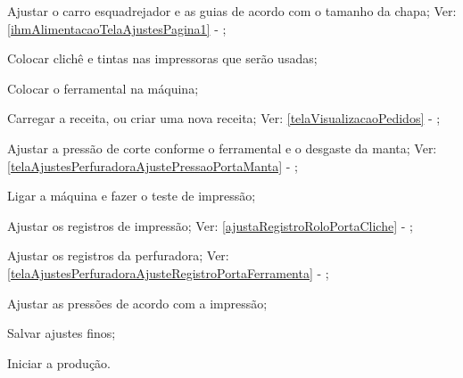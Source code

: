 \begin{procedureAdjustmentRecipe}
  
  \item[\ding{\dingNumber}] Ajustar o carro esquadrejador e as guias de acordo com o tamanho da chapa; Ver: \ref{ihmAlimentacaoTelaAjustesPagina1} - ;
  \item[\ding{\dingNumber}] Colocar clichê e tintas nas impressoras que serão usadas;
  \item[\ding{\dingNumber}] Colocar o ferramental na máquina;
  \item[\ding{\dingNumber}] Carregar a receita, ou criar uma nova receita; Ver: \ref{telaVisualizacaoPedidos} - ;
  \item[\ding{\dingNumber}] Ajustar a pressão de corte conforme o ferramental e o desgaste da manta; Ver: \ref{telaAjustesPerfuradoraAjustePressaoPortaManta} - ;
  \item[\ding{\dingNumber}] Ligar a máquina e fazer o teste de impressão;
  \item[\ding{\dingNumber}] Ajustar os registros de impressão; Ver: \ref{ajustaRegistroRoloPortaCliche} - ;
  \item[\ding{\dingNumber}] Ajustar os registros da perfuradora; Ver: \ref{telaAjustesPerfuradoraAjusteRegistroPortaFerramenta} - ;
  \item[\ding{\dingNumber}] Ajustar as pressões de acordo com a impressão;
  \item[\ding{\dingNumber}] Salvar ajustes finos;
  \item[\ding{\dingNumber}] Iniciar a produção.
  
\end{procedureAdjustmentRecipe}

